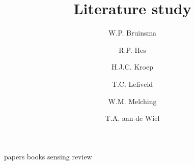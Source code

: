 \documentclass[a4paper, openany, oneside]{memoir}
\title{Literature study}
\author{W.P. Bruinsma \and R.P. Hes \and H.J.C. Kroep \and T.C. Leliveld \and W.M. Melching \and T.A. aan de Wiel}
\begin{document}
\frontmatter

\begin{titlingpage}
  \pagestyle{empty}
  \maketitle
\end{titlingpage}


\tableofcontents

\mainmatter
{papers}
{books}
{sensing}
{review}


\printbibliography

\appendix
\end{document}
